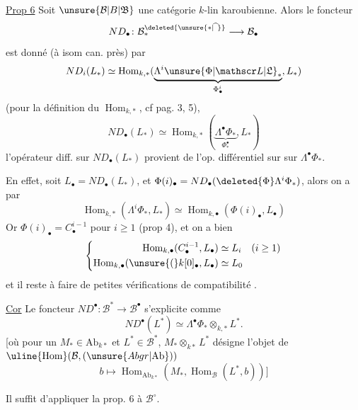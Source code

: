 
\uline{Prop 6} Soit $\unsure{\mathcal B|B|\mathfrak B}$ une catégorie $k$-lin karoubienne. Alors le foncteur
\[
 ND_\bullet\colon\mathcal B_*^{\deleted{\unsure{*|\widehat{\ }}}}\longrightarrow\mathcal B_\bullet
\]
est donné (à isom can. près) par
\[
 ND_i(L_*)\simeq\operatorname{Hom}_{k,*}(\underbrace{\Lambda^i\unsure{\Phi|\mathscr L|\mathfrak L}_*}_{\Phi^i_\bullet},L_*)
\]
(pour la définition du $\operatorname{Hom}_{k,*}$, cf pag. 3, 5),  
\[
 ND_\bullet(L_*)\simeq\operatorname{Hom}_{k,*}(\underbrace{\Lambda^\bullet\Phi_*}_{\Phi^\bullet_*},L_*)
\]
l'opérateur diff. sur $ND_\bullet(L_*)$ provient de l'op. différentiel sur  sur $\Lambda^\bullet\Phi_*$.

En effet,   soit $L_\bullet=ND_\bullet(L_*)$, et  $\Phi(i)_\bullet=ND_\bullet(\deleted{\Phi}\Lambda^i\Phi_*)$, alors on a par 
\[
 \operatorname{Hom}_{k,*}(\Lambda^i\Phi_*,L_*)\simeq\operatorname{Hom}_{k,\bullet}(\Phi(i)_\bullet,L_\bullet)
\]
Or $\Phi(i)_\bullet=C_\bullet^{i-1}$ pour $i\geq1$ (prop 4), et on  a bien
\[
 \left\{\begin{aligned}
 \operatorname{Hom}_{k,\bullet}(C_\bullet^{i-1},L_\bullet)&\simeq L_i\quad(i\geq1)\\
 \operatorname{Hom}_{k,\bullet}(\unsure{(}k[0]_\bullet,L_\bullet)&\simeq L_0
 \end{aligned}\right.
\]
et il reste à faire de petites vérifications de compatibilité .

\uline{Cor} Le foncteur $ND^\bullet\colon\mathcal B^*\to\mathcal B^\bullet$ s'explicite comme
\[
 ND^\bullet(L^*)\simeq\Lambda^\bullet\Phi_*\otimes_{k,*}L^*.
\]
[où pour un $M_*\in\mathrm{Ab}_{k*}$ et $L^*\in\mathcal B^*$,
$M_*\otimes_{k*}L^*$ désigne l'objet de $\uline{\operatorname{Hom}}(\mathcal B,(\unsure{Abgr|\mathrm{Ab}}))$
\[
 b\longmapsto\operatorname{Hom}_{\mathrm{Ab}_{k*}}(M_*,\operatorname{Hom}_{\mathcal B}(L^*,b))]
\]
\margin{$\big|$}

Il suffit d'appliquer la prop. 6 à $\mathcal B^\circ$.


